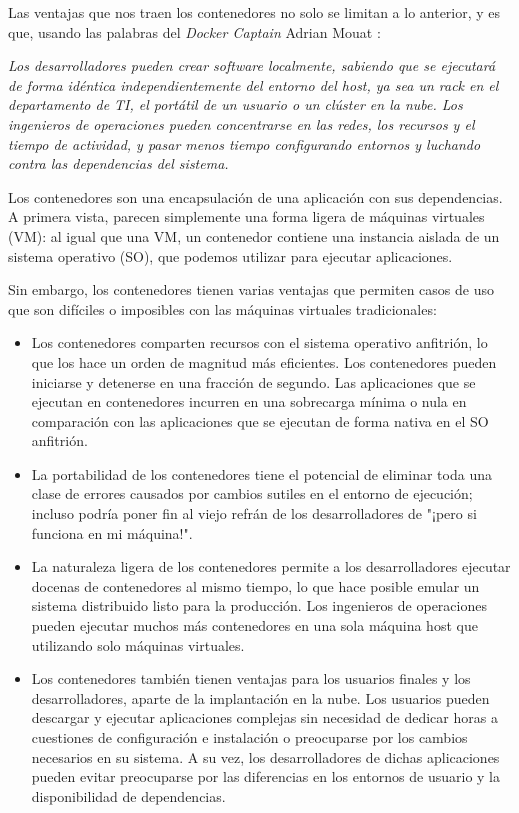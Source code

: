 Las ventajas que nos traen los contenedores no solo se limitan a lo anterior, y es que, usando las palabras del \textit{Docker Captain} Adrian Mouat \cite{dockerAdrianMouat}:


\begin{displayquote}
{\it Los desarrolladores pueden crear software localmente, sabiendo que se ejecutará de forma idéntica independientemente del entorno del host, ya sea un rack en el departamento de TI, el portátil de un usuario o un clúster en la nube. Los ingenieros de operaciones pueden concentrarse en las redes, los recursos y el tiempo de actividad, y pasar menos tiempo configurando entornos y luchando contra las dependencias del sistema. }
\end{displayquote}

Los contenedores son una encapsulación de una aplicación con sus dependencias. A primera vista, parecen simplemente una forma ligera de máquinas virtuales (VM): al igual que una VM, un contenedor contiene una instancia aislada de un sistema operativo (SO), que podemos utilizar para ejecutar aplicaciones.

Sin embargo, los contenedores tienen varias ventajas que permiten casos de uso que son difíciles o imposibles con las máquinas virtuales tradicionales:
\begin{itemize}
    \item Los contenedores comparten recursos con el sistema operativo anfitrión, lo que los hace un orden de magnitud más eficientes. Los contenedores pueden iniciarse y detenerse en una fracción de segundo. Las aplicaciones que se ejecutan en contenedores incurren en una sobrecarga mínima o nula en comparación con las aplicaciones que se ejecutan de forma nativa en el SO anfitrión.
    \item La portabilidad de los contenedores tiene el potencial de eliminar toda una clase de errores causados por cambios sutiles en el entorno de ejecución; incluso podría poner fin al viejo refrán de los desarrolladores de "¡pero si funciona en mi máquina!".
    \item La naturaleza ligera de los contenedores permite a los desarrolladores ejecutar docenas de contenedores al mismo tiempo, lo que hace posible emular un sistema distribuido listo para la producción. Los ingenieros de operaciones pueden ejecutar muchos más contenedores en una sola máquina host que utilizando solo máquinas virtuales.
    \item Los contenedores también tienen ventajas para los usuarios finales y los desarrolladores, aparte de la implantación en la nube. Los usuarios pueden descargar y ejecutar aplicaciones complejas sin necesidad de dedicar horas a cuestiones de configuración e instalación o preocuparse por los cambios necesarios en su sistema. A su vez, los desarrolladores de dichas aplicaciones pueden evitar preocuparse por las diferencias en los entornos de usuario y la disponibilidad de dependencias.
\end{itemize}

